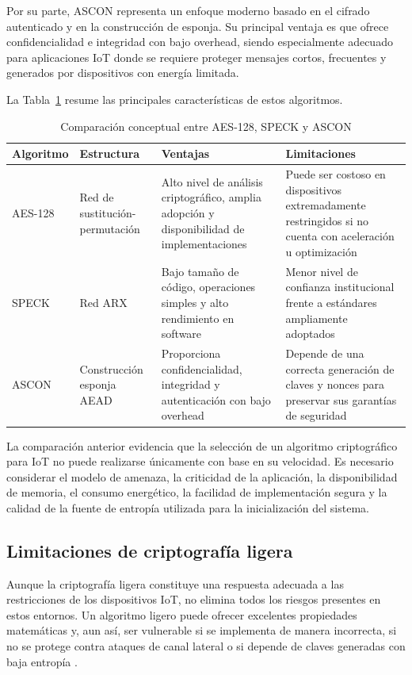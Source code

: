 Por su parte, ASCON representa un enfoque moderno basado en el cifrado autenticado y en la construcción de esponja. Su principal ventaja es que ofrece confidencialidad e integridad con bajo overhead, siendo especialmente adecuado para aplicaciones IoT donde se requiere proteger mensajes cortos, frecuentes y generados por dispositivos con energía limitada.

La Tabla~\ref{tab:comparacion_lwc} resume las principales características de estos algoritmos.

\begin{table}[htbp]
\centering
\caption{Comparación conceptual entre AES-128, SPECK y ASCON}
\label{tab:comparacion_lwc}
\begin{tabularx}{\textwidth}{@{}p{}p{}p{}X@{}}
\toprule
\textbf{Algoritmo} & \textbf{Estructura} & \textbf{Ventajas} & \textbf{Limitaciones} \\
\midrule
AES-128 & Red de sustitución-permutación & Alto nivel de análisis criptográfico, amplia adopción y disponibilidad de implementaciones & Puede ser costoso en dispositivos extremadamente restringidos si no cuenta con aceleración u optimización \\
SPECK & Red ARX & Bajo tamaño de código, operaciones simples y alto rendimiento en software & Menor nivel de confianza institucional frente a estándares ampliamente adoptados \\
ASCON & Construcción esponja AEAD & Proporciona confidencialidad, integridad y autenticación con bajo overhead & Depende de una correcta generación de claves y nonces para preservar sus garantías de seguridad \\
\bottomrule
\end{tabularx}
\end{table}

La comparación anterior evidencia que la selección de un algoritmo criptográfico para IoT no puede realizarse únicamente con base en su velocidad. Es necesario considerar el modelo de amenaza, la criticidad de la aplicación, la disponibilidad de memoria, el consumo energético, la facilidad de implementación segura y la calidad de la fuente de entropía utilizada para la inicialización del sistema.

\subsection{Limitaciones de criptografía ligera}

Aunque la criptografía ligera constituye una respuesta adecuada a las restricciones de los dispositivos IoT, no elimina todos los riesgos presentes en estos entornos. Un algoritmo ligero puede ofrecer excelentes propiedades matemáticas y, aun así, ser vulnerable si se implementa de manera incorrecta, si no se protege contra ataques de canal lateral o si depende de claves generadas con baja entropía \cite{MITRE2024CWE-327:Algorithm}.

